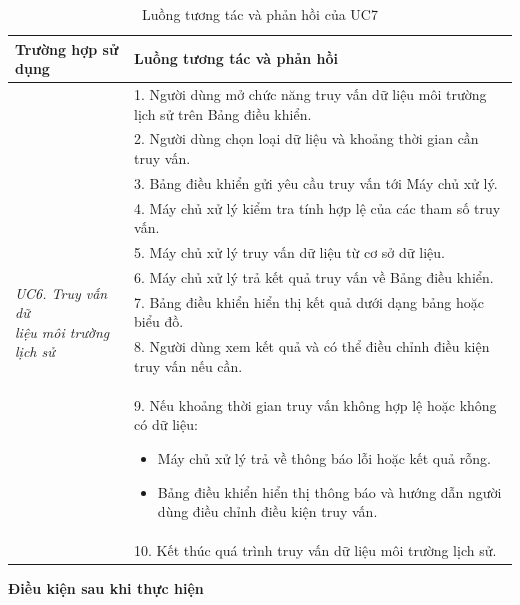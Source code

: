 \documentclass[a4paper,12pt]{article}
\begin{document}
\begin{table}[H]
\centering
\small
\caption{Luồng tương tác và phản hồi của UC7}
\begin{tabularx}{\linewidth}{|p{4cm}|X|}
\hline
\textbf{Trường hợp sử dụng} &
\textbf{Luồng tương tác và phản hồi} \\
\hline

\multirow{13}{=}{\parbox{3.8cm}{\centering\textit{UC6. Truy vấn dữ\\liệu môi trường lịch sử}}}
&
1. Người dùng mở chức năng truy vấn dữ liệu môi trường lịch sử trên Bảng điều khiển. \\

&
2. Người dùng chọn loại dữ liệu và khoảng thời gian cần truy vấn. \\

&
3. Bảng điều khiển gửi yêu cầu truy vấn tới Máy chủ xử lý. \\

&
4. Máy chủ xử lý kiểm tra tính hợp lệ của các tham số truy vấn. \\

&
5. Máy chủ xử lý truy vấn dữ liệu từ cơ sở dữ liệu. \\

&
6. Máy chủ xử lý trả kết quả truy vấn về Bảng điều khiển. \\

&
7. Bảng điều khiển hiển thị kết quả dưới dạng bảng hoặc biểu đồ. \\

&
8. Người dùng xem kết quả và có thể điều chỉnh điều kiện truy vấn nếu cần. \\

&
9. Nếu khoảng thời gian truy vấn không hợp lệ hoặc không có dữ liệu:
\begin{itemize}
    \item Máy chủ xử lý trả về thông báo lỗi hoặc kết quả rỗng.
    \item Bảng điều khiển hiển thị thông báo và hướng dẫn người dùng điều chỉnh điều kiện truy vấn.
\end{itemize}
\\

&
10. Kết thúc quá trình truy vấn dữ liệu môi trường lịch sử. \\
\hline

\end{tabularx}
\end{table}

\textbf{Điều kiện sau khi thực hiện}
\end{document}
